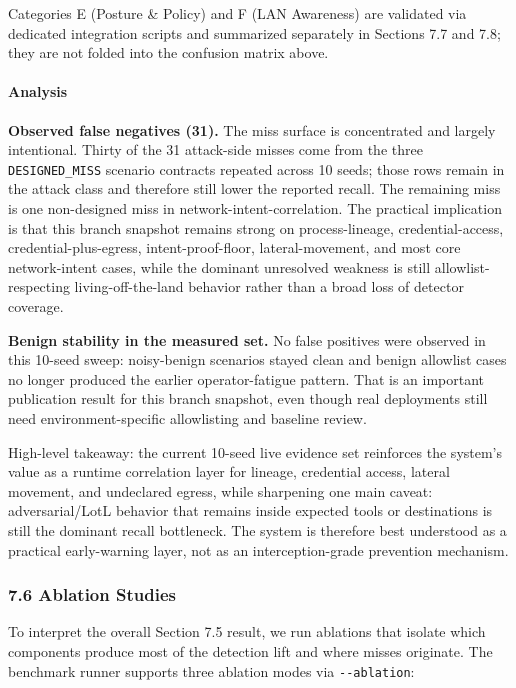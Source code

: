 \documentclass[
]{article}
\begin{document}
Categories E (Posture \& Policy) and F (LAN Awareness) are validated via
dedicated integration scripts and summarized separately in Sections 7.7
and 7.8; they are not folded into the confusion matrix above.

\paragraph{Analysis}\label{analysis}

\textbf{Observed false negatives (31).} The miss surface is concentrated
and largely intentional. Thirty of the 31 attack-side misses come from
the three \texttt{DESIGNED\_MISS} scenario contracts repeated across 10
seeds; those rows remain in the attack class and therefore still lower
the reported recall. The remaining miss is one non-designed miss in
network-intent-correlation. The practical implication is that this
branch snapshot remains strong on process-lineage, credential-access,
credential-plus-egress, intent-proof-floor, lateral-movement, and most
core network-intent cases, while the dominant unresolved weakness is
still allowlist-respecting living-off-the-land behavior rather than a
broad loss of detector coverage.

\textbf{Benign stability in the measured set.} No false positives were
observed in this 10-seed sweep: noisy-benign scenarios stayed clean and
benign allowlist cases no longer produced the earlier operator-fatigue
pattern. That is an important publication result for this branch
snapshot, even though real deployments still need environment-specific
allowlisting and baseline review.

High-level takeaway: the current 10-seed live evidence set reinforces
the system's value as a runtime correlation layer for lineage,
credential access, lateral movement, and undeclared egress, while
sharpening one main caveat: adversarial/LotL behavior that remains
inside expected tools or destinations is still the dominant recall
bottleneck. The system is therefore best understood as a practical
early-warning layer, not as an interception-grade prevention mechanism.

\subsubsection{7.6 Ablation Studies}\label{ablation-studies}

To interpret the overall Section 7.5 result, we run ablations that
isolate which components produce most of the detection lift and where
misses originate. The benchmark runner supports three ablation modes via
\texttt{-\/-ablation}:
\end{document}

